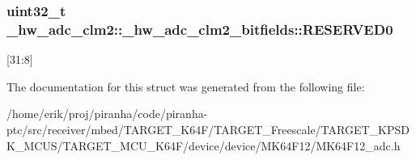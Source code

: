 \subsubsection[{\texorpdfstring{R\+E\+S\+E\+R\+V\+E\+D0}{RESERVED0}}]{\setlength{\rightskip}{0pt plus 5cm}uint32\+\_\+t \+\_\+hw\+\_\+adc\+\_\+clm2\+::\+\_\+hw\+\_\+adc\+\_\+clm2\+\_\+bitfields\+::\+R\+E\+S\+E\+R\+V\+E\+D0}\hypertarget{struct__hw__adc__clm2_1_1__hw__adc__clm2__bitfields_a6a74c6111750ed38dd04421798a6b3c2}{}\label{struct__hw__adc__clm2_1_1__hw__adc__clm2__bitfields_a6a74c6111750ed38dd04421798a6b3c2}
\mbox{[}31\+:8\mbox{]} 

The documentation for this struct was generated from the following file\+:\begin{DoxyCompactItemize}
\item 
/home/erik/proj/piranha/code/piranha-\/ptc/src/receiver/mbed/\+T\+A\+R\+G\+E\+T\+\_\+\+K64\+F/\+T\+A\+R\+G\+E\+T\+\_\+\+Freescale/\+T\+A\+R\+G\+E\+T\+\_\+\+K\+P\+S\+D\+K\+\_\+\+M\+C\+U\+S/\+T\+A\+R\+G\+E\+T\+\_\+\+M\+C\+U\+\_\+\+K64\+F/device/device/\+M\+K64\+F12/M\+K64\+F12\+\_\+adc.\+h\end{DoxyCompactItemize}
